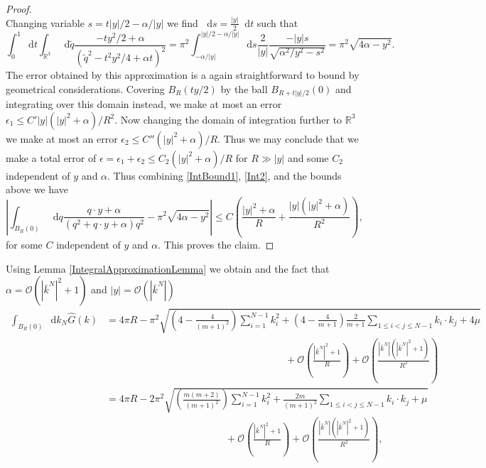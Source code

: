 \documentclass[a4paper,11pt]{article}
\newcommand{\abs}[1]{\left\lvert #1 \right\rvert}
\newcommand*\diff{\mathop{}\!\mathrm{d}}
\newcommand{\R}{\mathbb{R}}
\numberwithin{equation}{section}
\begin{document}
\begin{proof}
\begin{equation}
\end{equation}
Changing variable $ s=t\abs{y}/2-\alpha/\abs{y} $ we find $ \diff s=\frac{\abs{y}}{2} \diff t $ such that\begin{equation}
\int_{0}^{1}\diff t\int_{\R^3} \diff \tilde{q}\frac{-ty^2/2+\alpha}{(\tilde{q}^2-t^2y^2/4+\alpha t)^2}=\pi^2\int_{-\alpha/\abs{y}}^{\abs{y}/2-\alpha/\abs{y}}\diff s \frac{2}{\abs{y}}\frac{-\abs{y}s}{\sqrt{\alpha^2/y^2-s^2}}=\pi^2\sqrt{4\alpha-y^2}.\label{Int2}
\end{equation}
The error obtained by this approximation is a again straightforward to bound by geometrical considerations. Covering $ B_R(ty/2) $ by the ball $ B_{R+t\abs{y}/2}(0)$ and integrating over this domain instead, we make at most an error $ \epsilon_1\leq C'\abs{y}(\abs{y}^2+\alpha)/R^2 $. Now changing the domain of integration further to $ \R^3 $ we make at most an error $ \epsilon_2\leq C''(\abs{y}^2+\alpha)/R $. Thus we may conclude that we make a total error of $ \epsilon=\epsilon_1+\epsilon_2\leq C_2(\abs{y}^2+\alpha)/R $ for $ R\gg \abs{y} $ and some $ C_2 $ independent of $ y $ and $ \alpha $. Thus combining \eqref{IntBound1}, \eqref{Int2}, and the bounds above we have \begin{equation}
\abs{\int_{B_R(0)} \diff q\frac{q\cdot y+\alpha}{(q^2+q\cdot y+\alpha)q^2}-\pi^2\sqrt{4\alpha-y^2}}\leq C\left(\frac{\abs{y}^2+\alpha}{R}+\frac{\abs{y}(\abs{y}^2+\alpha)}{R^2}\right),
\end{equation}
for some $ C $ independent of $ y $ and $ \alpha $. This proves the claim.\end{proof}
Using Lemma \ref{IntegralApproximationLemma} we obtain and the fact that $ \alpha=\mathcal{O}\left(\abs{\bar{k}^N}^2+1\right) $ and $ \abs{y}=\mathcal{O}\left(\abs{\bar{k}^N}\right) $ \begin{equation}
\begin{aligned}
\int_{B_R(0)} \diff k_N \hat{G}(k)&=4\pi R-\pi^2\sqrt{\left(4-\frac{4}{(m+1)^2}\right)\sum_{i=1}^{N-1}k_i^2+\left(4-\frac{4}{m+1}\right)\frac{2}{m+1}\sum_{1\leq i<j\leq N-1}k_i\cdot k_j+4\mu}\\&\qquad\qquad\qquad\qquad\qquad\qquad\qquad\qquad\qquad+\mathcal{O}\left(\frac{\abs{\bar{k}^N}^2+1}{R}\right)+\mathcal{O}\left(\frac{\abs{\bar{k}^N}(\abs{\bar{k}^N}^2+1)}{R^2}\right)\qquad\\
&=4\pi R-2\pi^2\sqrt{\left(\frac{m(m+2)}{(m+1)^2}\right)\sum_{i=1}^{N-1}k_i^2+\frac{2m}{(m+1)^2}\sum_{1\leq i<j\leq N-1}k_i\cdot k_j+\mu}\\&\qquad\qquad\qquad\qquad\qquad\qquad+\mathcal{O}\left(\frac{\abs{\bar{k}^N}^2+1}{R}\right)+\mathcal{O}\left(\frac{\abs{\bar{k}^N}(\abs{\bar{k}^N}^2+1)}{R^2}\right),\qquad
\end{aligned}
\end{equation}
\end{document}
